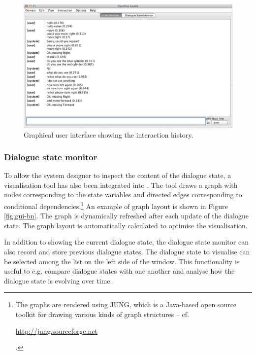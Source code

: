 \begin{figure}[h]
\centering
\includegraphics[scale=0.40]{imgs/gui-chatbox.png}
\caption{Graphical user interface showing the interaction history.}
\label{fig:gui-chatbox}
\end{figure}

\subsubsection*{Dialogue state monitor}

To allow the system designer to inspect the content of the dialogue state, a visualisation tool has also been integrated into \opendial .  The tool draws a graph with nodes corresponding to the state variables and directed edges corresponding to conditional dependencies.\footnote{The graphs are rendered using JUNG, which is a Java-based open source toolkit for drawing various kinds of graph structures -- cf. \begin{scriptsize}\url{http://jung.sourceforge.net}\end{scriptsize}.} An example of graph layout is shown in Figure \ref{fig:gui-bn}. The graph is dynamically refreshed after each update of the dialogue state. The graph layout is automatically calculated to optimise the visualisation. 

In addition to showing the current dialogue state, the dialogue state monitor can also record and store previous dialogue states.  The dialogue state to visualise can be selected among the list on the left side of the window. This functionality is useful to e.g. compare dialogue states with one another and analyse how the dialogue state is evolving over time. 

